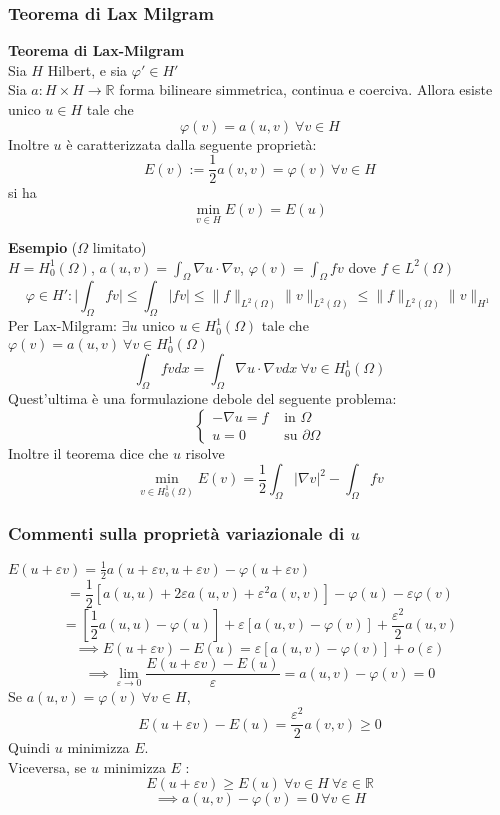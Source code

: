\documentclass[a4paper]{article}
\newcommand{\R}{\mathbb{R}}
\begin{document}
\subsubsection{Teorema di Lax Milgram}
\begin{tcolorbox}
\textbf{Teorema di Lax-Milgram}
\\Sia $H$ Hilbert, e sia $\varphi'\in H'$ 
\\Sia $a:H\times H\to \R $ forma bilineare simmetrica, continua e coerciva.
Allora esiste unico $u\in H$ tale che
\[\varphi(v)=a(u,v)\ \forall v\in H\]
Inoltre $u$ è caratterizzata dalla seguente proprietà: 
\[E(v):=\frac{1}{2}a(v,v)=\varphi(v)\ \forall v\in H\]
si ha 
\[\min_{v\in H}E(v)=E(u)\]
\end{tcolorbox}
\textbf{Esempio} ($\Omega$ limitato)
\\$H=H_0^1(\Omega)$, $a(u,v)=\int_{\Omega}^{} \nabla u\cdot \nabla v $, $\varphi(v)=\int_{\Omega}^{} fv $ dove $f\in L^{2}(\Omega)$ 
\[\varphi\in H':\bigg|\int_{\Omega}^{} fv\bigg|\le \int_{\Omega}^{} |fv|\le \|f\|_{L^{2}(\Omega)}\|v\|_{L^{2}(\Omega)}\le \|f\|_{L^{2}(\Omega)}\|v\|_{H^1}\]
Per Lax-Milgram: $\exists u$ unico $u\in H^1_0(\Omega)$ tale che $\varphi(v)=a(u,v)\ \forall v\in H_0^1(\Omega)$ 
\[\int_{\Omega}^{} fvdx=\int_{\Omega}^{} \nabla u\cdot \nabla vdx\ \forall v\in H_0^1(\Omega)\]
Quest'ultima è una formulazione debole del seguente problema:
\[\begin{cases}
	-\nabla u=f&\text{ in }\Omega
	\\u=0&\text{ su }\partial\Omega
\end{cases}\]
Inoltre il teorema dice che $u$ risolve 
\[\min_{v\in H_0^1(\Omega)}E(v)=\frac{1}{2} \int_{\Omega}^{} |\nabla v|^2-\int_{\Omega}^{} fv\]
\subsubsection{Commenti sulla proprietà variazionale di $u$ }
$E(u+\varepsilon v)=\frac{1}{2}a(u+\varepsilon v,u+\varepsilon v)-\varphi(u+\varepsilon v)$
\[=\frac{1}{2}[a(u,u)+2\varepsilon a(u,v)+\varepsilon^2a(v,v)]-\varphi(u)-\varepsilon\varphi(v)\]
\[=[\frac{1}{2}a(u,u)-\varphi(u)]+\varepsilon[a(u,v)-\varphi(v)]+ \frac{\varepsilon^2}{2}a(u,v)\]
\[\implies E(u+\varepsilon v)-E(u)=\varepsilon [a(u,v)-\varphi(v)]+o(\varepsilon)\]
\[\implies \lim_{\varepsilon \to 0} \frac{E(u+\varepsilon v)-E(u)}{\varepsilon}=a(u,v)-\varphi(v)=0\]
Se $a(u,v)=\varphi(v)\ \forall v\in H$, 
\[E(u+\varepsilon v)-E(u)= \frac{\varepsilon^2}{2}a(v,v)\ge 0\]
Quindi $u$ minimizza $E$.
\\Viceversa, se $u $ minimizza $E$ :
\[E(u+\varepsilon v)\ge E(u)\ \forall v\in H\ \forall \varepsilon\in \R\]
\[\implies a(u,v)-\varphi(v)=0\ \forall v\in H\]
\end{document}
